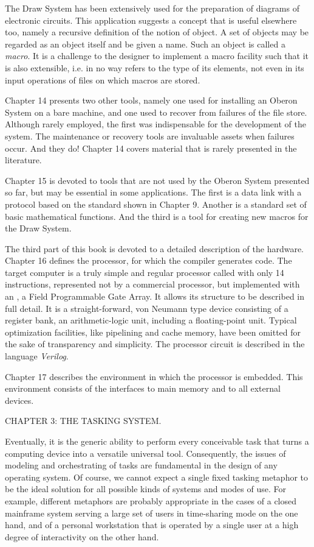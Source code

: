 The Draw System has been extensively used for the preparation of
diagrams of electronic circuits. This application suggests a concept
that is useful elsewhere too, namely a recursive definition of the
notion of object. A set of objects may be regarded as an object itself
and be given a name. Such an object is called a \emph{macro}. It is a
challenge to the designer to implement a macro facility such that it
is also extensible, i.e. in no way refers to the type of its elements,
not even in its input operations of files on which macros are stored.

Chapter 14 presents two other tools, namely one used for installing an
Oberon System on a bare machine, and one used to recover from failures
of the file store. Although rarely employed, the first was
indispensable for the development of the system. The maintenance or
recovery tools are invaluable assets when failures occur. And they do!
Chapter 14 covers material that is rarely presented in the literature.

Chapter 15 is devoted to tools that are not used by the Oberon System
presented so far, but may be essential in some applications. The first
is a data link with a protocol based on the  standard shown in
Chapter 9. Another is a standard set of basic mathematical
functions. And the third is a tool for creating new macros for the
Draw System.

The third part of this book is devoted to a detailed description of
the hardware. Chapter 16 defines the processor, for which the compiler
generates code. The target computer is a truly simple and regular
processor called \RISC with only 14 instructions, represented not by a
commercial processor, but implemented with an , a Field
Programmable Gate Array. It allows its structure to be described in
full detail. It is a straight-forward, von Neumann type device
consisting of a register bank, an arithmetic-logic unit, including a
floating-point unit. Typical optimization facilities, like pipelining
and cache memory, have been omitted for the sake of transparency and
simplicity. The processor circuit is described in the language
\emph{Verilog}.

Chapter 17 describes the environment in which the processor is
embedded. This environment consists of the interfaces to main memory
and to all external devices.

\beginchapter CHAPTER 3: THE TASKING SYSTEM.

Eventually, it is the generic ability to perform every conceivable
task that turns a computing device into a versatile universal
tool. Consequently, the issues of modeling and orchestrating of tasks
are fundamental in the design of any operating system. Of course, we
cannot expect a single fixed tasking metaphor to be the ideal solution
for all possible kinds of systems and modes of use. For example,
different metaphors are probably appropriate in the cases of a closed
mainframe system serving a large set of users in time-sharing mode on
the one hand, and of a personal workstation that is operated by a
single user at a high degree of interactivity on the other hand.

